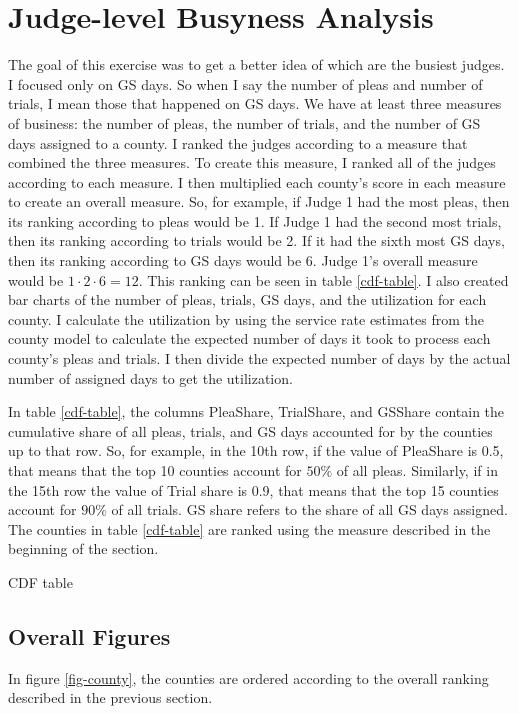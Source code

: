 \documentclass[11pt]{article}
\begin{document}
\section{Judge-level Busyness Analysis}
  The goal of this exercise was to get a better idea of which are the busiest judges.
  I focused only on GS days. So when I say the number of pleas and number of trials, I mean those that
  happened on GS days.
  We have at least three measures of business: the number of pleas, the number of trials, and
  the number of GS days assigned to a county. I ranked the judges according to a measure
  that combined the three measures. To create this measure, I ranked all of the judges according
  to each measure. I then multiplied each county's score in each measure to create an overall measure.
  So, for example, if Judge 1 had the most pleas, then its ranking according to pleas would be 1. If Judge 1 had the second most trials, then its ranking according to trials would be 2. If it had the sixth most GS days, then its ranking according to GS days would be 6. Judge 1's overall measure would be $1 \cdot 2 \cdot 6 = 12$. This ranking can be seen in table \ref{cdf-table}. I also created bar charts of the number of pleas, trials, GS days, and the utilization for each county. I calculate the utilization by using the service rate estimates from the county model to calculate the expected number of days it took to process each county's pleas and trials. I then divide the expected number of days by the actual number of assigned days to get the utilization.

  In table \ref{cdf-table}, the columns PleaShare, TrialShare, and GSShare
  contain the cumulative share of all pleas, trials, and GS days accounted for by the counties up to that row. So, for example, in the 10th row, if the value of PleaShare is 0.5, that means that the top
  10 counties account for $50\%$ of all pleas. Similarly, if in the 15th row the value of Trial share is 0.9, that means that the top 15 counties account for $90\%$ of all trials. GS share refers to the share of all GS days assigned. The counties in table \ref{cdf-table} are ranked using the measure described in the beginning of the section.

  \begin{table}[H]
    \centering
    \small
    \caption{CDF table}
    \label{cdf-table}
    
  \end{table}


  \subsection{Overall Figures}
   In figure \ref{fig-county}, the counties are ordered according to the overall ranking described in the previous section.
\end{document}
